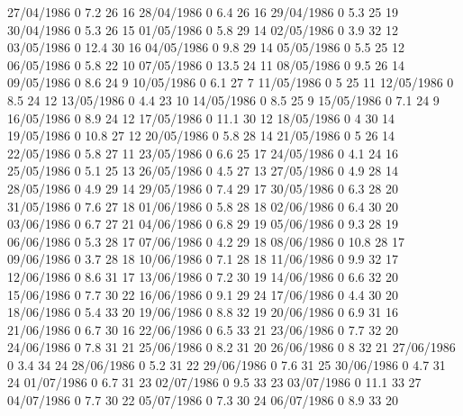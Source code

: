 27/04/1986  0      7.2    26     16 
28/04/1986  0      6.4    26     16 
29/04/1986  0      5.3    25     19 
30/04/1986  0      5.3    26     15 
01/05/1986  0      5.8    29     14 
02/05/1986  0      3.9    32     12 
03/05/1986  0      12.4   30     16 
04/05/1986  0      9.8    29     14 
05/05/1986  0      5.5    25     12 
06/05/1986  0      5.8    22     10 
07/05/1986  0      13.5   24     11 
08/05/1986  0      9.5    26     14 
09/05/1986  0      8.6    24     9 
10/05/1986  0      6.1    27     7 
11/05/1986  0      5      25     11 
12/05/1986  0      8.5    24     12 
13/05/1986  0      4.4    23     10 
14/05/1986  0      8.5    25     9 
15/05/1986  0      7.1    24     9 
16/05/1986  0      8.9    24     12 
17/05/1986  0      11.1   30     12 
18/05/1986  0      4      30     14 
19/05/1986  0      10.8   27     12 
20/05/1986  0      5.8    28     14 
21/05/1986  0      5      26     14 
22/05/1986  0      5.8    27     11 
23/05/1986  0      6.6    25     17 
24/05/1986  0      4.1    24     16 
25/05/1986  0      5.1    25     13 
26/05/1986  0      4.5    27     13 
27/05/1986  0      4.9    28     14 
28/05/1986  0      4.9    29     14 
29/05/1986  0      7.4    29     17 
30/05/1986  0      6.3    28     20 
31/05/1986  0      7.6    27     18 
01/06/1986  0      5.8    28     18 
02/06/1986  0      6.4    30     20 
03/06/1986  0      6.7    27     21 
04/06/1986  0      6.8    29     19 
05/06/1986  0      9.3    28     19 
06/06/1986  0      5.3    28     17 
07/06/1986  0      4.2    29     18 
08/06/1986  0      10.8   28     17 
09/06/1986  0      3.7    28     18 
10/06/1986  0      7.1    28     18 
11/06/1986  0      9.9    32     17 
12/06/1986  0      8.6    31     17 
13/06/1986  0      7.2    30     19 
14/06/1986  0      6.6    32     20 
15/06/1986  0      7.7    30     22 
16/06/1986  0      9.1    29     24 
17/06/1986  0      4.4    30     20 
18/06/1986  0      5.4    33     20 
19/06/1986  0      8.8    32     19 
20/06/1986  0      6.9    31     16 
21/06/1986  0      6.7    30     16 
22/06/1986  0      6.5    33     21 
23/06/1986  0      7.7    32     20 
24/06/1986  0      7.8    31     21 
25/06/1986  0      8.2    31     20 
26/06/1986  0      8      32     21 
27/06/1986  0      3.4    34     24 
28/06/1986  0      5.2    31     22 
29/06/1986  0      7.6    31     25 
30/06/1986  0      4.7    31     24 
01/07/1986  0      6.7    31     23 
02/07/1986  0      9.5    33     23 
03/07/1986  0      11.1   33     27 
04/07/1986  0      7.7    30     22 
05/07/1986  0      7.3    30     24 
06/07/1986  0      8.9    33     20 
